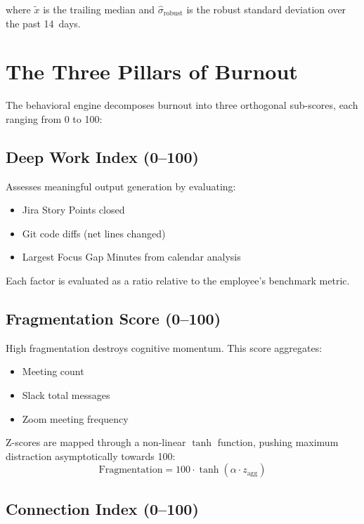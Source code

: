 \documentclass[12pt, a4paper, oneside]{report}
\begin{document}
where $\tilde{x}$ is the trailing median and $\hat{\sigma}_{\text{robust}}$ is the robust standard deviation over the past 14~days.

\section{The Three Pillars of Burnout}
\label{sec:pillars}

The behavioral engine decomposes burnout into three orthogonal sub-scores, each ranging from 0 to 100:

\subsection{Deep Work Index (0--100)}

Assesses meaningful output generation by evaluating:
\begin{itemize}
    \item Jira Story Points closed
    \item Git code diffs (net lines changed)
    \item Largest Focus Gap Minutes from calendar analysis
\end{itemize}

Each factor is evaluated as a ratio relative to the employee's benchmark metric.

\subsection{Fragmentation Score (0--100)}

High fragmentation destroys cognitive momentum. This score aggregates:
\begin{itemize}
    \item Meeting count
    \item Slack total messages
    \item Zoom meeting frequency
\end{itemize}

Z-scores are mapped through a non-linear $\tanh$ function, pushing maximum distraction asymptotically towards 100:
\[
    \text{Fragmentation} = 100 \cdot \tanh\!\left(\alpha \cdot z_{\text{agg}}\right)
\]

\subsection{Connection Index (0--100)}
\end{document}
